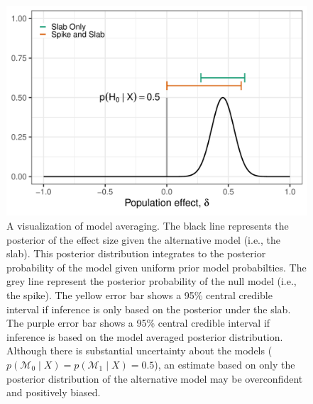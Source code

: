 \documentclass[a4paper]{article}
\newcommand{\model}{\mathcal{M}}
\begin{document}
\begin{figure}[!ht]
	\includegraphics[width=\textwidth]{spikeAndSlabPosteriorRescaledPosteriorMode.pdf}
	\caption{A visualization of model averaging. The black line represents the posterior of the effect size given the alternative model (i.e., the slab). This posterior distribution integrates to the posterior probability of the model given uniform prior model probabilties. The grey line represent the posterior probability of the null model (i.e., the spike). The yellow error bar shows a 95\% central credible interval if inference is only based on the posterior under the slab. The purple error bar shows a 95\% central credible interval if inference is based on the model averaged posterior distribution. Although there is substantial uncertainty about the models ($p(\model_0\mid X) = p(\model_1\mid X) = 0.5$), an estimate based on only the posterior distribution of the alternative model may be overconfident and positively biased.}
	\label{fig:modelAveragedPosterior}
\end{figure}
\end{document}
